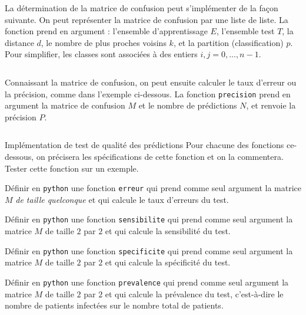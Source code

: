 \documentclass[12pt,fancy]{cours}
\begin{document}


La détermination de la matrice de confusion peut s'implémenter de la façon suivante. On peut représenter la matrice de confusion par une liste de liste. La fonction prend en argument : l’ensemble d’apprentissage $E$, l’ensemble test $T$, la distance $d$, le nombre de plus proches voisins $k$, et la partition (classification) $p$. Pour simplifier, les classes sont associées à des entiers $i,j = 0,...,n-1$.
\inputminted{python}{./code/matrice_confus.py}
Connaissant la matrice de confusion, on peut ensuite calculer le taux d’erreur ou la précision, comme dans l’exemple ci-dessous. La fonction \texttt{precision} prend en argument la matrice de confusion $M$ et le nombre de prédictions $N$, et renvoie la précision $P$.
\inputminted{python}{./code/precision.py}

\begin{exemple}{Implémentation de test de qualité des prédictions}
    Pour chacune des fonctions ce-dessous, on précisera les spécifications de cette fonction et on la commentera. Tester cette fonction sur un exemple.
    \begin{quest}
        \item Définir en \texttt{python} une fonction \texttt{erreur} qui prend comme seul argument  la matrice $M$ \emph{de taille quelconque} et qui calcule le taux d'erreurs du test. 
        \item Définir en \texttt{python} une fonction \texttt{sensibilite} qui prend comme seul argument  la matrice $M$ de taille $2$ par $2$ et qui calcule la sensibilité du test. 
        \item Définir en \texttt{python} une fonction \texttt{specificite}  qui prend comme seul argument  la matrice $M$ de taille $2$ par $2$  et qui calcule la spécificité du test. 
        \item Définir en \texttt{python} une fonction \texttt{prevalence} qui prend comme seul argument la matrice $M$ de taille $2$ par $2$  et qui calcule la prévalence du test, c’est-à-dire le nombre de patients infectées sur le nombre total de patients.
    \end{quest}
\end{exemple}
\end{document}

